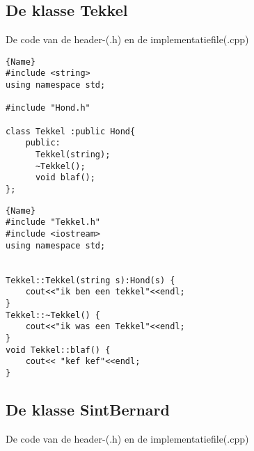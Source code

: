 \newpage
\subsection{De klasse Tekkel}
De code van de header-(.h) en de implementatiefile(.cpp)\\ 

\noindent\hspace{-1cm}\begin{minipage}{.43\textwidth}
\begin{lstlisting}[caption=Tekkel declaratie file(.h),frame=tlrb,label={lst:vbTekkelH}]{Name}
#include <string>
using namespace std;

#include "Hond.h"

class Tekkel :public Hond{
	public:
      Tekkel(string);
	  ~Tekkel();
	  void blaf();
};		
\end{lstlisting}
\end{minipage}\hfill
\hspace{0.7cm}\begin{minipage}{.60\textwidth}
\begin{lstlisting}[caption=Tekkel implementatie file file(.cpp),frame=tlrb,label={lst:vbTekkelCPP}]{Name}
#include "Tekkel.h"
#include <iostream>
using namespace std;


Tekkel::Tekkel(string s):Hond(s) {
	cout<<"ik ben een tekkel"<<endl;
}
Tekkel::~Tekkel() {
	cout<<"ik was een Tekkel"<<endl;
}
void Tekkel::blaf() {
	cout<< "kef kef"<<endl;
}		
\end{lstlisting}
\end{minipage}

\subsection{De klasse SintBernard}
De code van de header-(.h) en de implementatiefile(.cpp)\\ 

